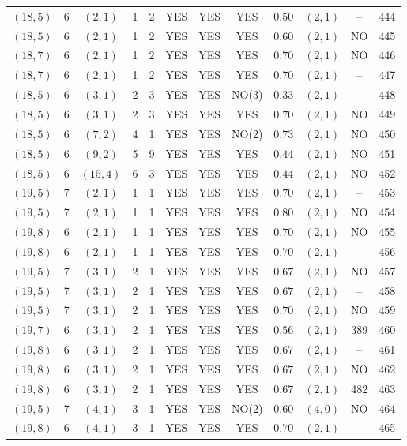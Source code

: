 \begin{longtable}{|c|c|c|c|c|c|c|c|c|c|c|c|}
$(18,5)$ & 6 & $(2,1)$ & 1 & 2 & YES & YES & YES & $0.50$ & $(2,1)$ & -- & 444\\
$(18,5)$ & 6 & $(2,1)$ & 1 & 2 & YES & YES & YES & $0.60$ & $(2,1)$ & NO & 445\\
$(18,7)$ & 6 & $(2,1)$ & 1 & 2 & YES & YES & YES & $0.70$ & $(2,1)$ & NO & 446\\
$(18,7)$ & 6 & $(2,1)$ & 1 & 2 & YES & YES & YES & $0.70$ & $(2,1)$ & -- & 447\\
$(18,5)$ & 6 & $(3,1)$ & 2 & 3 & YES & YES & NO(3) & $0.33$ & $(2,1)$ & -- & 448\\
$(18,5)$ & 6 & $(3,1)$ & 2 & 3 & YES & YES & YES & $0.70$ & $(2,1)$ & NO & 449\\
$(18,5)$ & 6 & $(7,2)$ & 4 & 1 & YES & YES & NO(2) & $0.73$ & $(2,1)$ & NO & 450\\
$(18,5)$ & 6 & $(9,2)$ & 5 & 9 & YES & YES & YES & $0.44$ & $(2,1)$ & NO & 451\\
$(18,5)$ & 6 & $(15,4)$ & 6 & 3 & YES & YES & YES & $0.44$ & $(2,1)$ & NO & 452\\
$(19,5)$ & 7 & $(2,1)$ & 1 & 1 & YES & YES & YES & $0.70$ & $(2,1)$ & -- & 453\\
$(19,5)$ & 7 & $(2,1)$ & 1 & 1 & YES & YES & YES & $0.80$ & $(2,1)$ & NO & 454\\
$(19,8)$ & 6 & $(2,1)$ & 1 & 1 & YES & YES & YES & $0.70$ & $(2,1)$ & NO & 455\\
$(19,8)$ & 6 & $(2,1)$ & 1 & 1 & YES & YES & YES & $0.70$ & $(2,1)$ & -- & 456\\
$(19,5)$ & 7 & $(3,1)$ & 2 & 1 & YES & YES & YES & $0.67$ & $(2,1)$ & NO & 457\\
$(19,5)$ & 7 & $(3,1)$ & 2 & 1 & YES & YES & YES & $0.67$ & $(2,1)$ & -- & 458\\
$(19,5)$ & 7 & $(3,1)$ & 2 & 1 & YES & YES & YES & $0.70$ & $(2,1)$ & NO & 459\\
$(19,7)$ & 6 & $(3,1)$ & 2 & 1 & YES & YES & YES & $0.56$ & $(2,1)$ & 389 & 460\\
$(19,8)$ & 6 & $(3,1)$ & 2 & 1 & YES & YES & YES & $0.67$ & $(2,1)$ & -- & 461\\
$(19,8)$ & 6 & $(3,1)$ & 2 & 1 & YES & YES & YES & $0.67$ & $(2,1)$ & NO & 462\\
$(19,8)$ & 6 & $(3,1)$ & 2 & 1 & YES & YES & YES & $0.67$ & $(2,1)$ & 482 & 463\\
$(19,5)$ & 7 & $(4,1)$ & 3 & 1 & YES & YES & NO(2) & $0.60$ & $(4,0)$ & NO & 464\\
$(19,8)$ & 6 & $(4,1)$ & 3 & 1 & YES & YES & YES & $0.70$ & $(2,1)$ & -- & 465\\

\end{longtable}
